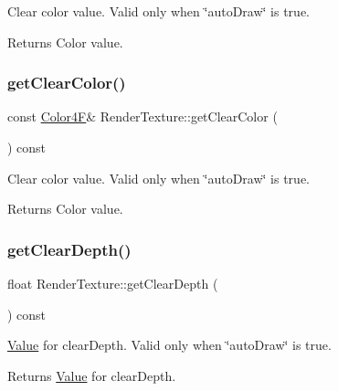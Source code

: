 Clear color value. Valid only when \char`\"{}auto\+Draw\char`\"{} is true.

\begin{DoxyReturn}{Returns}
Color value. 
\end{DoxyReturn}
\mbox{\label{classRenderTexture_a817a532e942a9eb456a2bb354eae2b42}} 
\subsubsection{\texorpdfstring{get\+Clear\+Color()}{getClearColor()}\hspace{0.1cm}{\footnotesize\ttfamily [2/2]}}
{\footnotesize\ttfamily const \hyperlink{structColor4F}{Color4F}\& Render\+Texture\+::get\+Clear\+Color (\begin{DoxyParamCaption}{ }\end{DoxyParamCaption}) const\hspace{0.3cm}{\ttfamily [inline]}}

Clear color value. Valid only when \char`\"{}auto\+Draw\char`\"{} is true.

\begin{DoxyReturn}{Returns}
Color value. 
\end{DoxyReturn}
\mbox{\label{classRenderTexture_ade767eafbb1c6214ffe3150591ed8c90}} 
\subsubsection{\texorpdfstring{get\+Clear\+Depth()}{getClearDepth()}\hspace{0.1cm}{\footnotesize\ttfamily [1/2]}}
{\footnotesize\ttfamily float Render\+Texture\+::get\+Clear\+Depth (\begin{DoxyParamCaption}{ }\end{DoxyParamCaption}) const\hspace{0.3cm}{\ttfamily [inline]}}

\hyperlink{classValue}{Value} for clear\+Depth. Valid only when \char`\"{}auto\+Draw\char`\"{} is true.

\begin{DoxyReturn}{Returns}
\hyperlink{classValue}{Value} for clear\+Depth. 
\end{DoxyReturn}
\mbox{\label{classRenderTexture_ade767eafbb1c6214ffe3150591ed8c90}} 
